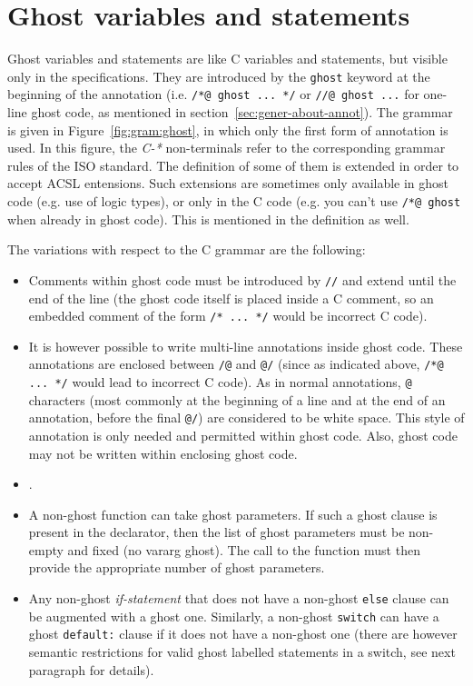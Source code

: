 \section{Ghost variables and statements}
\label{sec:ghost}
Ghost variables and statements are like C variables and statements,
but visible only in the specifications. They are introduced by the
\lstinline|ghost| keyword at the beginning of the annotation
(i.e. \lstinline|/*@ ghost ... */| or \lstinline|//@ ghost ...|
for one-line
ghost code, as mentioned in section~\ref{sec:gener-about-annot}).
The grammar is given in Figure~\ref{fig:gram:ghost}, in which only the
first form of annotation is used. In this figure, the \textit{C-*}
non-terminals refer to the corresponding grammar rules of the ISO standard.
The definition of some of them is extended in order to accept ACSL entensions.
Such extensions are sometimes only available in ghost code (e.g. use of logic types), or only in the C code (e.g. you can't use \lstinline|/*@ ghost| when already in ghost code). This is mentioned in the definition as well.

The variations with respect to the C
grammar are the following:
\begin{itemize}
\item Comments within ghost code must be introduced by \lstinline|//| and extend until the
  end of the line (the ghost code itself is placed inside a C
  comment, so an embedded comment of the form \lstinline|/* ... */| would be incorrect C code).
\item It is however possible to write multi-line annotations inside ghost
  code. These annotations are enclosed between
  \lstinline|/@| and \lstinline|@/|
  (since as indicated above, \lstinline|/*@ ... */| would lead
  to incorrect C code).
  As in normal annotations, \lstinline|@| characters (most commonly at the beginning of a
  line and at the end of an annotation, before the final \lstinline|@/|) are
  considered to be white space.
  This style of annotation is only needed and permitted within ghost code.
  Also, ghost code may not be written within enclosing ghost code.

\item {}.
\item A non-ghost function can take ghost parameters.
  If such a ghost
  clause is present in the declarator, then the list of ghost
  parameters must be non-empty and fixed (no vararg ghost). The call
  to the function must then provide the appropriate number of ghost parameters.
\item Any non-ghost \textit{if-statement} that does not have a non-ghost
  \lstinline|else| clause can be augmented with a ghost one.
  Similarly, a non-ghost
  \lstinline|switch| can have a ghost \lstinline|default:| clause
  if it does not have a non-ghost one
  (there are however semantic restrictions for valid
  ghost labelled statements in a switch, see next paragraph for details).
\end{itemize}

